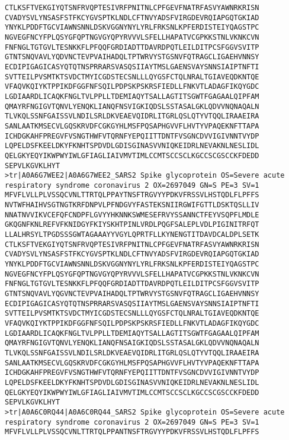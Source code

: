 \documentclass[en,black,12pt,normal]{elegantnote}
\begin{document}
\begin{lstlisting}
CTLKSFTVEKGIYQTSNFRVQPTESIVRFPNITNLCPFGEVFNATRFASVYAWNRKRISN
CVADYSVLYNSASFSTFKCYGVSPTKLNDLCFTNVYADSFVIRGDEVRQIAPGQTGKIAD
YNYKLPDDFTGCVIAWNSNNLDSKVGGNYNYLYRLFRKSNLKPFERDISTEIYQAGSTPC
NGVEGFNCYFPLQSYGFQPTNGVGYQPYRVVVLSFELLHAPATVCGPKKSTNLVKNKCVN
FNFNGLTGTGVLTESNKKFLPFQQFGRDIADTTDAVRDPQTLEILDITPCSFGGVSVITP
GTNTSNQVAVLYQDVNCTEVPVAIHADQLTPTWRVYSTGSNVFQTRAGCLIGAEHVNNSY
ECDIPIGAGICASYQTQTNSPRRARSVASQSIIAYTMSLGAENSVAYSNNSIAIPTNFTI
SVTTEILPVSMTKTSVDCTMYICGDSTECSNLLLQYGSFCTQLNRALTGIAVEQDKNTQE
VFAQVKQIYKTPPIKDFGGFNFSQILPDPSKPSKRSFIEDLLFNKVTLADAGFIKQYGDC
LGDIAARDLICAQKFNGLTVLPPLLTDEMIAQYTSALLAGTITSGWTFGAGAALQIPFAM
QMAYRFNGIGVTQNVLYENQKLIANQFNSVIGKIQDSLSSTASALGKLQDVVNQNAQALN
TLVKQLSSNFGAISSVLNDILSRLDKVEAEVQIDRLITGRLQSLQTYVTQQLIRAAEIRA
SANLAATKMSECVLGQSKRVDFCGKGYHLMSFPQSAPHGVVFLHVTYVPAQEKNFTTAPA
ICHDGKAHFPREGVFVSNGTHWFVTQRNFYEPQIITTDNTFVSGNCDVVIGIVNNTVYDP
LQPELDSFKEELDKYFKNHTSPDVDLGDISGINASVVNIQKEIDRLNEVAKNLNESLIDL
QELGKYEQYIKWPWYIWLGFIAGLIAIVMVTIMLCCMTSCCSCLKGCCSCGSCCKFDEDD
SEPVLKGVKLHYT
>tr|A0A6G7WEE2|A0A6G7WEE2_SARS2 Spike glycoprotein OS=Severe acute respiratory syndrome coronavirus 2 OX=2697049 GN=S PE=3 SV=1
MFVFLVLLPLVSSQCVNLTTRTQLPPAYTNSFTRGVYYPDKVFRSSVLHSTQDLFLPFFS
NVTWFHAIHVSGTNGTKRFDNPVLPFNDGVYFASTEKSNIIRGWIFGTTLDSKTQSLLIV
NNATNVVIKVCEFQFCNDPFLGVYYHKNNKSWMESEFRVYSSANNCTFEYVSQPFLMDLE
GKQGNFKNLREFVFKNIDGYFKIYSKHTPINLVRDLPQGFSALEPLVDLPIGINITRFQT
LLALHRSYLTPGDSSSGWTAGAAAYYVGYLQPRTFLLKYNENGTITDAVDCALDPLSETK
CTLKSFTVEKGIYQTSNFRVQPTESIVRFPNITNLCPFGEVFNATRFASVYAWNRKRISN
CVADYSVLYNSASFSTFKCYGVSPTKLNDLCFTNVYADSFVIRGDEVRQIAPGQTGKIAD
YNYKLPDDFTGCVIAWNSNNLDSKVGGNYNYLYRLFRKSNLKPFERDISTEIYQAGSTPC
NGVEGFNCYFPLQSYGFQPTNGVGYQPYRVVVLSFELLHAPATVCGPKKSTNLVKNKCVN
FNFNGLTGTGVLTESNKKFLPFQQFGRDIADTTDAVRDPQTLEILDITPCSFGGVSVITP
GTNTSNQVAVLYQGVNCTEVPVAIHADQLTPTWRVYSTGSNVFQTRAGCLIGAEHVNNSY
ECDIPIGAGICASYQTQTNSPRRARSVASQSIIAYTMSLGAENSVAYSNNSIAIPTNFTI
SVTTEILPVSMTKTSVDCTMYICGDSTECSNLLLQYGSFCTQLNRALTGIAVEQDKNTQE
VFAQVKQIYKTPPIKDFGGFNFSQILPDPSKPSKRSFIEDLLFNKVTLADAGFIKQYGDC
LGDIAARDLICAQKFNGLTVLPPLLTDEMIAQYTSALLAGTITSGWTFGAGAALQIPFAM
QMAYRFNGIGVTQNVLYENQKLIANQFNSAIGKIQDSLSSTASALGKLQDVVNQNAQALN
TLVKQLSSNFGAISSVLNDILSRLDKVEAEVQIDRLITGRLQSLQTYVTQQLIRAAEIRA
SANLAATKMSECVLGQSKRVDFCGKGYHLMSFPQSAPHGVVFLHVTYVPAQEKNFTTAPA
ICHDGKAHFPREGVFVSNGTHWFVTQRNFYEPQIITTDNTFVSGNCDVVIGIVNNTVYDP
LQPELDSFKEELDKYFKNHTSPDVDLGDISGINASVVNIQKEIDRLNEVAKNLNESLIDL
QELGKYEQYIKWPWYIWLGFIAGLIAIVMVTIMLCCMTSCCSCLKGCCSCGSCCKFDEDD
SEPVLKGVKLHYT
>tr|A0A6C0RQ44|A0A6C0RQ44_SARS2 Spike glycoprotein OS=Severe acute respiratory syndrome coronavirus 2 OX=2697049 GN=S PE=3 SV=1
MFVFLVLLPLVSSQCVNLTTRTQLPPANTNSFTRGVYYPDKVFRSSVLHSTQDLFLPFFS

\end{lstlisting}
\end{document}
